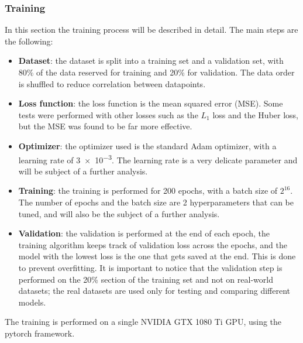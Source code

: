 \documentclass[a4paper,12pt,sort&compress]{article}
\begin{document}
\subsubsection*{Training}
    In this section the training process will be described in detail. The main steps are the
    following:
    \begin{itemize}
        \item \textbf{Dataset}: the dataset is split into a training set and a validation set, with
        80\% of the data reserved for training and 20\% for validation. The data order is shuffled
        to reduce correlation between datapoints.
        \item \textbf{Loss function}: the loss function is the mean squared error (MSE). Some tests
        were performed with other losses such as the $L_1$ loss and the Huber loss, but the MSE was
        found to be far more effective.
        \item \textbf{Optimizer}: the optimizer used is the standard Adam optimizer, with a learning
        rate of \num{3e-3}. The learning rate is a very delicate parameter and will be subject of a
        further analysis.
        \item \textbf{Training}: the training is performed for 200 epochs, with a batch size of
        $2^{16}$. The number of epochs and the batch size are 2 hyperparameters that can be tuned, and will also be the
        subject of a further analysis. 
        \item \textbf{Validation}: the validation is performed at the end of each epoch, the
        training algorithm keeps track of validation loss across the epochs, and the model with the
        lowest loss is the one that gets saved at the end. This is done to prevent overfitting. It
        is important to notice that the validation step is performed on the 20\% section of the
        training set and not on real-world datasets; the real datasets are used only for testing and
        comparing different models.
    \end{itemize}

    The training is performed on a single NVIDIA GTX 1080 Ti GPU, using the pytorch framework.
\end{document}
